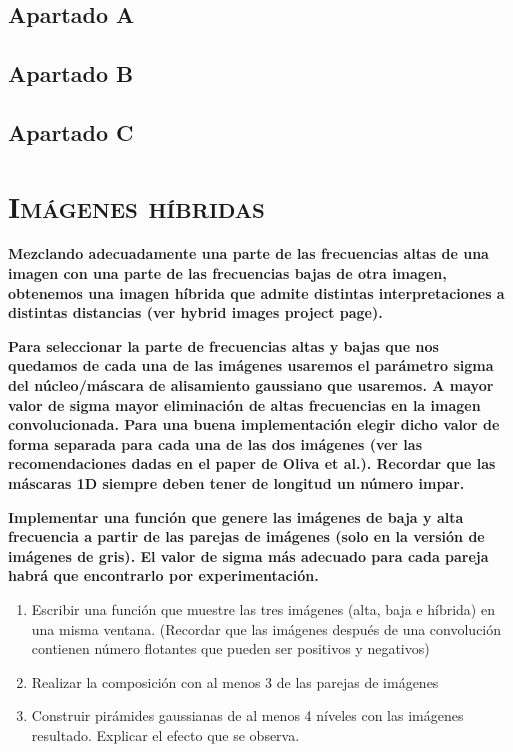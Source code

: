 \documentclass[11pt,a4paper]{article}
\begin{document}
\subsection{Apartado A}

\subsection{Apartado B}

\subsection{Apartado C}

\newpage

\section{\textsc{Imágenes híbridas}}

\noindent \textbf{Mezclando adecuadamente una parte de las frecuencias altas de una imagen con una parte de
las frecuencias bajas de otra imagen, obtenemos una imagen híbrida que admite distintas interpretaciones a distintas
distancias (ver hybrid images project page).}

\noindent \textbf{Para seleccionar la parte de frecuencias altas y bajas que nos quedamos
de cada una de las imágenes usaremos el parámetro sigma del núcleo/máscara de alisamiento gaussiano que usaremos.
A mayor valor de sigma mayor eliminación de altas frecuencias en la imagen convolucionada. Para una buena
implementación elegir dicho valor de forma separada para cada una de las dos imágenes (ver las recomendaciones
dadas en el paper de Oliva et al.). Recordar que las máscaras 1D siempre deben tener de longitud un número impar.}

\noindent \textbf{Implementar una función que genere las imágenes de baja y alta frecuencia a partir de las
parejas de imágenes (solo en la versión de imágenes de gris). El valor de sigma más adecuado para cada pareja
habrá que encontrarlo por experimentación.}

\begin{enumerate}
	\item Escribir una función que muestre las tres imágenes (alta, baja e híbrida) en una misma ventana.
	(Recordar que las imágenes después de una convolución contienen número flotantes que pueden ser positivos y negativos)
	\item Realizar la composición con al menos 3 de las parejas de imágenes
	\item Construir pirámides gaussianas de al menos 4 níveles con las imágenes resultado. Explicar el efecto que se observa.
\end{enumerate}
\end{document}
